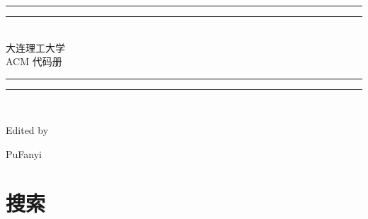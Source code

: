 \documentclass[a4paper,11pt,twoside,fontset = fandol,UTF8]{ctexbook} %
\begin{document}
 
  \begin{titlepage}       %
  \centering
  \vspace*{\baselineskip}
  \rule{\textwidth}{1.6pt}\vspace*{-\baselineskip}\vspace*{2pt}
  \rule{\textwidth}{0.4pt}\\[\baselineskip]
  {\Huge 大连理工大学\\[\baselineskip]\LARGE ACM 代码册}
  \\[0.2\baselineskip]
  \rule{\textwidth}{0.4pt}\vspace*{-\baselineskip}\vspace{3.2pt}
  \rule{\textwidth}{1.6pt}\\[\baselineskip]
  \scshape
  
  \vspace*{3\baselineskip}
  Edited by \\[\baselineskip] {PuFanyi\par}
  
  \par
\end{titlepage}
\newpage            %
\tableofcontents     %

\chapter{搜索}    %
\setcounter{page}{1} %
\end{document}
